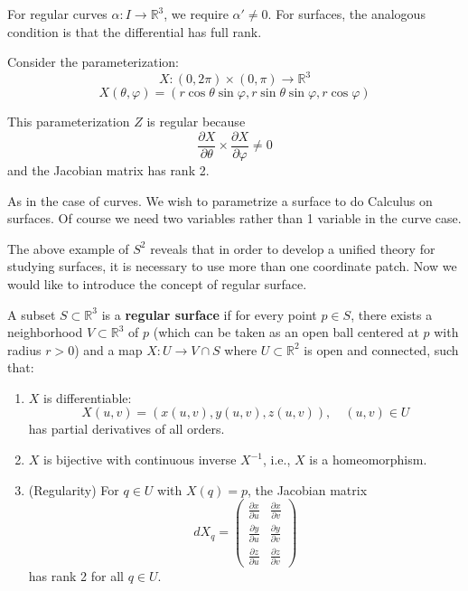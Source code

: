 \documentclass{article}
\begin{document}
\begin{remark}
For regular curves $\alpha: I \rightarrow \mathbb{R}^3$, we require $\alpha' \neq 0$. For surfaces, the analogous condition is that the differential has full rank.
\end{remark}

\begin{example}
    Consider the parameterization:
\[
X: (0,2\pi) \times (0,\pi) \rightarrow \mathbb{R}^3
\]
\[
X(\theta, \varphi) = (r\cos\theta\sin\varphi, r\sin\theta\sin\varphi, r\cos\varphi)
\]


This parameterization $Z$ is regular because
\[
\frac{\partial X}{\partial \theta} \times \frac{\partial X}{\partial \varphi} \neq 0
\]
and the Jacobian matrix has rank 2.

\end{example}
As in the case of curves. We wish to parametrize a surface to do Calculus on surfaces. Of course we need two variables rather than 1 variable in the curve case.
\begin{remark}
The above example of ${S}^2$ reveals that in order to develop a unified theory for studying surfaces, it is necessary to use more than one coordinate patch. Now we would like to introduce the concept of regular surface.  
\end{remark}
\begin{definition}
A subset $S \subset \mathbb{R}^3$ is a \textbf{regular surface} if for every point $p \in S$, there exists a neighborhood $V \subset \mathbb{R}^3$ of $p$ (which can be taken as an open ball centered at $p$ with radius $r > 0$) and a map $X: U \rightarrow V \cap S$ where $U \subset \mathbb{R}^2$ is open and connected, such that:

\begin{enumerate}
    \item $X$ is differentiable: 
    \[
    X(u,v) = (x(u,v), y(u,v), z(u,v)), \quad (u,v) \in U
    \]
    has partial derivatives of all orders.
    
    \item $X$ is bijective with continuous inverse $X^{-1}$, i.e., $X$ is a homeomorphism.
    
    \item (Regularity) For $q \in U$ with $X(q) = p$, the Jacobian matrix
    \[
    dX_q = \begin{pmatrix}
    \frac{\partial x}{\partial u} & \frac{\partial x}{\partial v} \\
    \frac{\partial y}{\partial u} & \frac{\partial y}{\partial v} \\
    \frac{\partial z}{\partial u} & \frac{\partial z}{\partial v}
    \end{pmatrix}
    \]
    has rank 2 for all $q \in U$.
\end{enumerate}
\end{definition}
\end{document}

